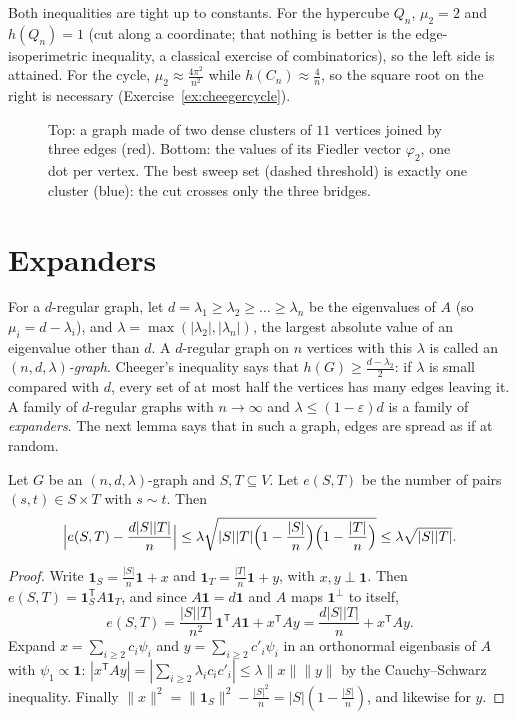 Both inequalities are tight up to constants. For the hypercube $Q_n$, $\mu_2=2$ and $h(Q_n)=1$ (cut along a coordinate; that nothing is better is the edge-isoperimetric inequality, a classical
exercise of combinatorics), so the left side is attained. For the cycle, $\mu_2\approx\frac{4\pi^2}{n^2}$ while $h(C_n)\approx\frac4n$, so the square root on the right is necessary (Exercise~\ref{ex:cheegercycle}).

\begin{figure}[ht]
\centering
{}
\caption{Top: a graph made of two dense clusters of $11$ vertices joined by three edges (red). Bottom: the values of its Fiedler vector $\varphi_2$, one dot per vertex. The best
sweep set (dashed threshold) is exactly one cluster (blue): the cut crosses only the three bridges.}
\label{fig:fiedler}
\end{figure}

\section{Expanders}

For a $d$-regular graph, let $d=\lambda_1\ge\lambda_2\ge\dots\ge\lambda_n$ be the eigenvalues of $A$ (so $\mu_i=d-\lambda_i$), and $\lambda=\max(|\lambda_2|,|\lambda_n|)$, the largest absolute value of an
eigenvalue other than $d$. A $d$-regular graph on $n$ vertices with this $\lambda$ is called an \emph{$(n,d,\lambda)$-graph}. Cheeger's inequality says that $h(G)\ge\frac{d-\lambda_2}2$: if $\lambda$ is small compared
with $d$, every set of at most half the vertices has many edges leaving it. A family of $d$-regular graphs with $n\to\infty$ and $\lambda\le(1-\varepsilon)d$ is a family of \emph{expanders}. The
next lemma says that in such a graph, edges are spread as if at random.

\begin{lemma}\label{lem:mixing}
Let $G$ be an $(n,d,\lambda)$-graph and $S,T\subseteq V$. Let $e(S,T)$ be the number of pairs $(s,t)\in S\times T$ with $s\sim t$. Then
\[
\Bigl|e(S,T)-\frac{d|S||T|}n\Bigr|\le\lambda\sqrt{|S||T|\Bigl(1-\frac{|S|}n\Bigr)\Bigl(1-\frac{|T|}n\Bigr)}\le\lambda\sqrt{|S||T|}.
\]
\end{lemma}
\begin{proof}
Write $\mathbf1_S=\frac{|S|}n\mathbf1+x$ and $\mathbf1_T=\frac{|T|}n\mathbf1+y$, with $x,y\perp\mathbf1$. Then $e(S,T)=\mathbf1_S^{\mathsf T}A\mathbf1_T$, and since $A\mathbf1=d\mathbf1$ and $A$ maps $\mathbf1^\perp$ to itself,
\[
e(S,T)=\frac{|S||T|}{n^2}\,\mathbf1^{\mathsf T}A\mathbf1+x^{\mathsf T}Ay=\frac{d|S||T|}n+x^{\mathsf T}Ay.
\]
Expand $x=\sum_{i\ge2}c_i\psi_i$ and $y=\sum_{i\ge2}c'_i\psi_i$ in an orthonormal eigenbasis of $A$ with $\psi_1\propto\mathbf1$: $|x^{\mathsf T}Ay|=|\sum_{i\ge2}\lambda_ic_ic'_i|\le\lambda\|x\|\|y\|$ by the Cauchy--Schwarz
inequality. Finally $\|x\|^2=\|\mathbf1_S\|^2-\frac{|S|^2}n=|S|(1-\frac{|S|}n)$, and likewise for $y$.
\end{proof}


